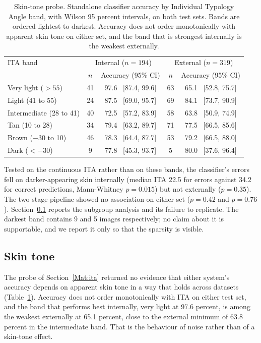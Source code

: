 \documentclass{melba}
\begin{document}
\begin{table}[t]
\centering
\caption{Skin-tone probe. Standalone classifier accuracy by Individual Typology Angle band, with Wilson 95 percent intervals, on both test sets. Bands are ordered lightest to darkest. Accuracy does not order monotonically with apparent skin tone on either set, and the band that is strongest internally is the weakest externally.}
\small
\begin{tabular}{|l|c|c|c|c|}
\hline
ITA band & \multicolumn{2}{c|}{Internal ($n=194$)} & \multicolumn{2}{c|}{External ($n=319$)} \\
 & $n$ & Accuracy (95\% CI) & $n$ & Accuracy (95\% CI) \\
\hline
Very light ($>55$) & 41 & 97.6 \ [87.4, 99.6] & 63 & 65.1 \ [52.8, 75.7] \\
Light (41 to 55) & 24 & 87.5 \ [69.0, 95.7] & 69 & 84.1 \ [73.7, 90.9] \\
Intermediate (28 to 41) & 40 & 72.5 \ [57.2, 83.9] & 58 & 63.8 \ [50.9, 74.9] \\
Tan (10 to 28) & 34 & 79.4 \ [63.2, 89.7] & 71 & 77.5 \ [66.5, 85.6] \\
Brown ($-30$ to 10) & 46 & 78.3 \ [64.4, 87.7] & 53 & 79.2 \ [66.5, 88.0] \\
Dark ($<-30$) & 9 & 77.8 \ [45.3, 93.7] & 5 & 80.0 \ [37.6, 96.4] \\
\hline
\end{tabular}

\vspace{2mm}
\parbox{0.95\textwidth}{\footnotesize Tested on the continuous ITA rather than on these bands, the classifier's errors fell on darker-appearing skin internally (median ITA 22.5 for errors against 34.2 for correct predictions, Mann-Whitney $p=0.015$) but not externally ($p=0.35$). The two-stage pipeline showed no association on either set ($p=0.42$ and $p=0.76$). Section~\ref{Res:ita} reports the subgroup analysis and its failure to replicate. The darkest band contains 9 and 5 images respectively; no claim about it is supportable, and we report it only so that the sparsity is visible.}
\label{tab:ita}
\end{table}

\subsection{Skin tone}
\label{Res:ita}
The probe of Section~\ref{Mat:ita} returned no evidence that either system's accuracy depends on apparent skin tone in a way that holds across datasets (Table~\ref{tab:ita}). Accuracy does not order monotonically with ITA on either test set, and the band that performs best internally, very light at 97.6 percent, is among the weakest externally at 65.1 percent, close to the external minimum of 63.8 percent in the intermediate band. That is the behaviour of noise rather than of a skin-tone effect.
\end{document}
